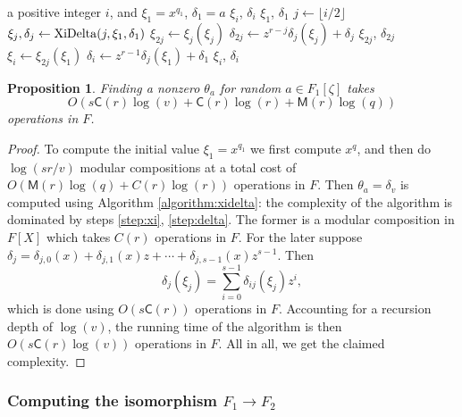 \documentclass[12pt]{article}
\theoremstyle{plain}
\newtheorem{proposition}[theorem]{Proposition}
\theoremstyle{definition}
\def\MM{\ensuremath{\mathsf{M}}}
\def\CC{\ensuremath{\mathsf{C}}}
\newcounter{algorithm}
\begin{document}
\begin{algorithm}
	\label{algorithm:xidelta}
	\begin{algorithmic}[1]
		\REQUIRE a positive integer $i$, and $\xi_1 = x^{q_1}$, $\delta_1 = a$
		\ENSURE $\xi_i$, $\delta_i$
		\RETURN $\xi_1$, $\delta_1$
		\ENDIF
		\STATE $j \leftarrow \lfloor i/2\rfloor$
		\STATE $\xi_{j}, \delta_j \leftarrow {\rm XiDelta}(j,\xi_1,\delta_1)$ 
		\STATE\label{step:xi} $\xi_{2j} \leftarrow \xi_j(\xi_j)$
		\STATE\label{step:delta} $\delta_{2j} \leftarrow z^{r - j}\delta_j(\xi_j) + \delta_j$
		\RETURN $\xi_{2j}$, $\delta_{2j}$
		\ENDIF
		\STATE $\xi_i \leftarrow \xi_{2j}(\xi_1)$
		\STATE $\delta_i \leftarrow z^{r - 1}\delta_j(\xi_1) + \delta_1$
		\RETURN $\xi_i$, $\delta_i$
	\end{algorithmic}
\end{algorithm}

\begin{proposition}
	\label{proposition:XiDelta}
	Finding a nonzero $\theta_a$ for random $a \in F_1[\zeta]$ takes \[O(s\CC(r)\log(v) + 
	\CC(r)\log(r) + \MM(r)\log(q))\] operations in $F$.
\end{proposition}
\begin{proof}
	To compute the initial value $\xi_1 = x^{q_1}$ we first compute $x^q$, and then do $\log(sr/v)$ 
	modular compositions at a total cost of $O(\MM(r)\log(q) + C(r)\log(r))$ operations in $F$. 
	Then $\theta_a = \delta_v$ is computed using Algorithm \ref{algorithm:xidelta}: the complexity 
	of the algorithm is dominated by steps \ref{step:xi}, \ref{step:delta}. The former is a
	modular composition in $F[X]$ which takes $C(r)$ operations in $F$. For the later suppose 
	$\delta_j = \delta_{j,0}(x) + \delta_{j,1}(x)z + \cdots + \delta_{j,s - 1}(x)z^{s - 1}$. Then   
	\[ \delta_j(\xi_j) = \sum_{i = 0}^{s - 1}\delta_{ij}(\xi_j)z^i, \] which is done using 
	$O(s\CC(r))$ operations in $F$. Accounting for a recursion depth of $\log(v)$, the running 
	time of the algorithm is then $O(s\CC(r)\log(v))$ operations in $F$. All in all, we get the 
	claimed 
	complexity.
\end{proof}


\subsubsection{Computing the isomorphism $F_1 \rightarrow F_2$}
\end{document}
